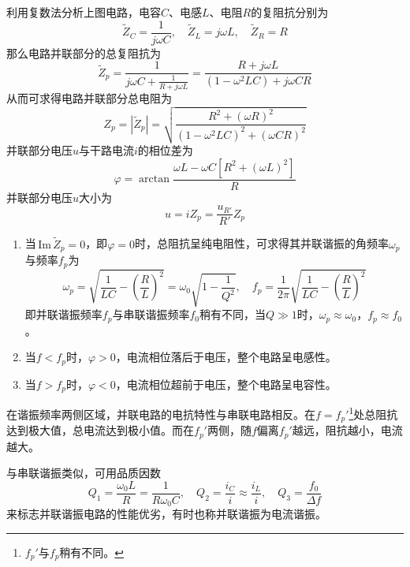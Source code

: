 \documentclass[UTF8]{article}
\def\Im{\mathrm{\,Im}\,}
\theoremstyle{MyLineTheoremStyle} %
\theoremstyle{MyBlockTheoremStyle} %
\theoremstyle{MySubsubsectionStyle} %
\begin{document}
利用复数法分析上图电路，电容$ C $、电感$ L $、电阻$ R $的复阻抗分别为
\begin{equation}
\tilde{Z}_C=\frac{1}{j\omega C},\quad\tilde{Z}_L=j\omega L,\quad \tilde{Z}_R=R
\end{equation}
那么电路并联部分的总复阻抗为
\begin{equation}
\tilde{Z}_p=\frac{1}{j\omega C+\frac{1}{R+j\omega L}}=\frac{R+j\omega L}{(1-\omega^2LC)+j\omega CR}
\end{equation}
从而可求得电路并联部分总电阻为
\begin{equation}
Z_p=\left|\tilde{Z}_p\right|=\sqrt{\frac{R^2+(\omega R)^2}{(1-\omega^2LC)^2+(\omega CR)^2}}
\end{equation}
并联部分电压$ u $与干路电流$ i $的相位差为
\begin{equation}
\varphi=\arctan\frac{\omega L-\omega C[R^2+(\omega L)^2]}{R}
\end{equation}
并联部分电压$ u $大小为
\begin{equation}
u=iZ_p=\frac{u_{R'}}{R'}Z_p
\end{equation}

\begin{enumerate}
\item 当$ \Im \tilde{Z}_p=0 $，即$ \varphi=0 $时，总阻抗呈纯电阻性，可求得其并联谐振的角频率$ \omega_p $与频率$ f_p $为
\begin{equation}
\omega_p=\sqrt{\frac{1}{LC}-\left(\frac RL\right)^2}=\omega_0\sqrt{1-\frac{1}{Q^2}},\quad f_p=\frac{1}{2\pi}\sqrt{\frac{1}{LC}-\left(\frac RL\right)^2}
\end{equation}
即并联谐振频率$ f_p $与串联谐振频率$ f_0 $稍有不同，当$ Q\gg 1 $时，$ \omega_p\approx\omega_0 $，$ f_p\approx f_0 $。

\item 当$ f<f_p $时，$ \varphi>0 $，电流相位落后于电压，整个电路呈电感性。

\item 当$ f>f_p $时，$ \varphi<0 $，电流相位超前于电压，整个电路呈电容性。
\end{enumerate}


在谐振频率两侧区域，并联电路的电抗特性与串联电路相反。在$ f=f_p' $\footnote{$ f_p' $与$ f_p $稍有不同。}处总阻抗达到极大值，总电流达到极小值。而在$ f_p' $两侧，随$ f $偏离$ f_p' $越远，阻抗越小，电流越大。

与串联谐振类似，可用品质因数
\begin{equation}
Q_1=\frac{\omega_0L}{R}=\frac{1}{R\omega_0C},\quad Q_2=\frac{i_C}{i}\approx\frac{i_L}{i},\quad Q_3=\frac{f_0}{\Delta f}
\end{equation}
来标志并联谐振电路的性能优劣，有时也称并联谐振为电流谐振。
\end{document}
